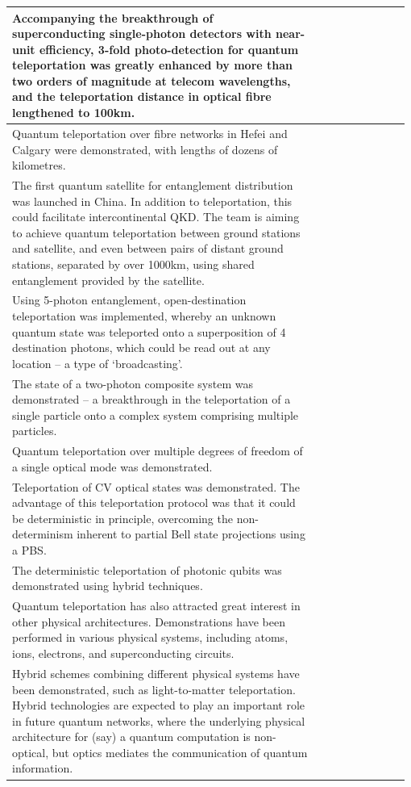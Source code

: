 \documentclass[aps, rmp, twocolumn, amsmath, amssymb, nofootinbib, superscriptaddress, longbibliography, floatfix, table-of-contents, eqsecnum]{revtex4-1}
\begin{document}
\begin{table}[!htb]
\begin{tabular}{|p{0.755\linewidth}|p{0.22\linewidth}|}
	\hline
	Accompanying the breakthrough of superconducting single-photon detectors with near-unit efficiency, 3-fold photo-detection for quantum teleportation was greatly enhanced by more than two orders of magnitude at telecom wavelengths, and the teleportation distance in optical fibre lengthened to 100km. & \cite{bib:Optica_2_832} \\
	\hline
	Quantum teleportation over fibre networks in Hefei and Calgary were demonstrated, with lengths of dozens of kilometres. & \cite{bib:Nat_Phot_10_671, bib:Nat_Phot_10_676} \\
	\hline
	The first quantum satellite for entanglement distribution was launched in China. In addition to teleportation, this could facilitate intercontinental QKD. The team is aiming to achieve quantum teleportation between ground stations and satellite, and even between pairs of distant ground stations, separated by over 1000km, using shared entanglement provided by the satellite. & \cite{bib:Nat_535_478} \\
	\hline
	Using 5-photon entanglement, open-destination teleportation was implemented, whereby an unknown quantum state was teleported onto a superposition of 4 destination photons, which could be read out at any location -- a type of `broadcasting'. & \cite{bib:Nat_430_54} \\
	\hline
	The state of a two-photon composite system was demonstrated -- a breakthrough in the teleportation of a single particle onto a complex system comprising multiple particles. & \cite{bib:Nat_Phys_2_678} \\
	\hline
	Quantum teleportation over multiple degrees of freedom of a single optical mode was demonstrated. & \cite{bib:Nat_518_516} \\
	\hline
	Teleportation of CV optical states was demonstrated. The advantage of this teleportation protocol was that it could be deterministic in principle,  overcoming the non-determinism inherent to partial Bell state projections using a PBS. & \cite{bib:Science_282_706} \\
	\hline
	The deterministic teleportation of photonic qubits was demonstrated using hybrid techniques. & \cite{bib:Nat_500_315} \\
	\hline
	Quantum teleportation has also attracted great interest in other physical architectures. Demonstrations have been performed in various physical systems, including atoms, ions, electrons, and superconducting circuits. & \cite{bib:Nat_Phys_9_400, bib:Nat_429_734, bib:Nat_429_737, bib:Science_345_532, bib:Nat_500_319} \\
	\hline
Hybrid schemes combining different physical systems have been demonstrated, such as light-to-matter teleportation. Hybrid technologies are expected to play an important role in future quantum networks, where the underlying physical architecture for (say) a quantum computation is non-optical, but optics mediates the communication of quantum information. & \cite{bib:Nat_443_557, bib:Nat_Comm_4_2744} \\
	\hline
\end{tabular}
\end{table}
\end{document}
